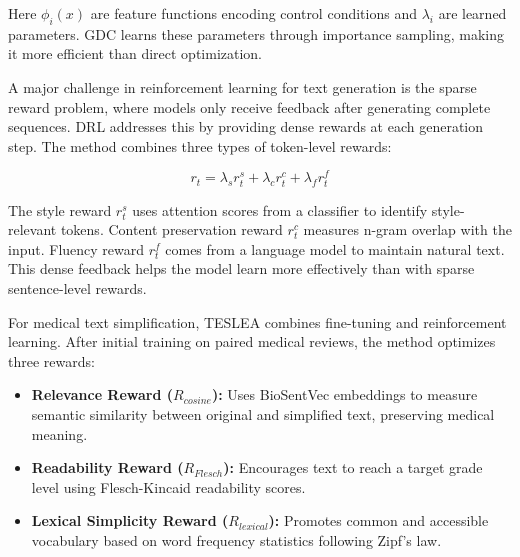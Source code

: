 Here $\phi_i(x)$ are feature functions encoding control conditions and $\lambda_i$ are learned parameters. 
GDC learns these parameters through importance sampling, making it more efficient than direct optimization.

A major challenge in reinforcement learning for text generation is the sparse reward problem, where models only receive feedback after generating complete sequences. 
DRL \cite{upadhyay2022efficientreinforcementlearningunsupervised} addresses this by providing dense rewards at each generation step. The method combines three types of token-level rewards:

\begin{equation}
r_t = \lambda_s r_t^s + \lambda_c r_t^c + \lambda_f r_t^f
\end{equation}

The style reward $r_t^s$ uses attention scores from a classifier to identify style-relevant tokens. 
Content preservation reward $r_t^c$ measures n-gram overlap with the input. 
Fluency reward $r_t^f$ comes from a language model to maintain natural text. 
This dense feedback helps the model learn more effectively than with sparse sentence-level rewards.

% 
% 
% 
% 

For medical text simplification, TESLEA \cite{info:doi/10.2196/38095} combines fine-tuning and reinforcement learning. After initial training on paired medical reviews, the method optimizes three rewards:

\begin{itemize}
    \item \textbf{Relevance Reward ($R_{cosine}$):} Uses BioSentVec embeddings \cite{Chen_2019} to measure semantic similarity between original and simplified text, preserving medical meaning.
    
    \item \textbf{Readability Reward ($R_{Flesch}$):} Encourages text to reach a target grade level using Flesch-Kincaid readability scores.
    
    \item \textbf{Lexical Simplicity Reward ($R_{lexical}$):} Promotes common and accessible vocabulary based on word frequency statistics following Zipf's law.
\end{itemize}

